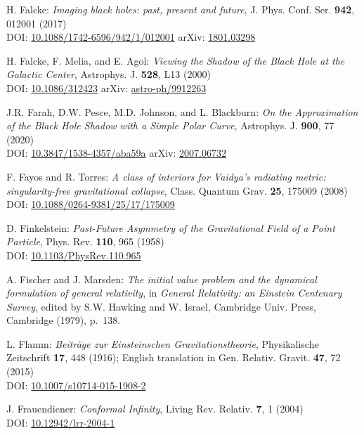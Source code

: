 \begin{thebibliography}{123}
H. Falcke:
{\em Imaging black holes: past, present and future},
J. Phys. Conf. Ser. {\bf 942}, 012001 (2017)\\
DOI: \href{https://doi.org/10.1088/1742-6596/942/1/012001}{10.1088/1742-6596/942/1/012001}\hfill
arXiv: \href{https://arxiv.org/abs/1801.03298}{1801.03298}

H. Falcke, F. Melia, and E. Agol:
{\em Viewing the Shadow of the Black Hole at the Galactic Center},
Astrophys. J. {\bf 528}, L13 (2000)\\
DOI: \href{https://doi.org/10.1086/312423}{10.1086/312423}\hfill
arXiv: \href{https://arxiv.org/abs/astro-ph/9912263}{astro-ph/9912263}

J.R. Farah, D.W. Pesce, M.D. Johnson, and L. Blackburn:
{\em On the Approximation of the Black Hole Shadow with a Simple Polar Curve},
Astrophys. J. {\bf 900}, 77 (2020)\\
DOI: \href{https://doi.org/10.3847/1538-4357/aba59a}{10.3847/1538-4357/aba59a}\hfill
arXiv: \href{https://arxiv.org/abs/2007.06732}{2007.06732}

F. Fayos and R. Torres:
{\em A class of interiors for Vaidya's radiating metric: singularity-free gravitational collapse},
Class. Quantum Grav. {\bf 25}, 175009 (2008)\\
DOI: \href{https://doi.org/10.1088/0264-9381/25/17/175009}{10.1088/0264-9381/25/17/175009}

D. Finkelstein:
{\em Past-Future Asymmetry of the Gravitational Field of a Point Particle},
Phys. Rev. {\bf 110}, 965 (1958)\\
DOI: \href{https://doi.org/10.1103/PhysRev.110.965}{10.1103/PhysRev.110.965}

A. Fischer and J. Marsden:
{\em The initial value problem and the dynamical formulation of general relativity},
in {\em General Relativity: an Einstein
Centenary Survey}, edited by S.W. Hawking and W. Israel,
Cambridge Univ. Press, Cambridge (1979), p.~138.

L. Flamm: {\em Beiträge zur Einsteinschen Gravitationstheorie},
Physikalische Zeitschrift {\bf 17}, 448 (1916); English translation in
Gen. Relativ. Gravit. {\bf 47}, 72 (2015)\\
DOI: \href{https://doi.org/10.1007/s10714-015-1908-2}{10.1007/s10714-015-1908-2}

J. Frauendiener:
{\em Conformal Infinity},
Living Rev. Relativ. {\bf 7}, 1 (2004) \\
DOI: \href{https://doi.org/10.12942/lrr-2004-1}{10.12942/lrr-2004-1}


\end{thebibliography}
